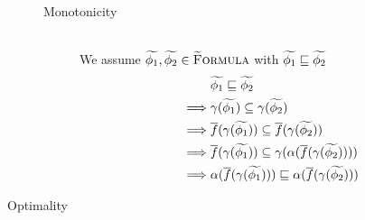 \begin{proofatend}
\begin{description}
\begin{description}
            \item[Monotonicity]~\\ 
            We assume $\widetilde{\phi_1}, \widetilde{\phi_2} \in \textup{\textsc{\ensuremath{\widetilde{\text{F}}}ormula}}$ with $\widetilde{\phi_1} \sqsubseteq \widetilde{\phi_2}$
            \begin{align*}
            &\grad{\phi_1} \mpt \grad{\phi_2}\\
            \implies
            &\gamma(\grad{\phi_1}) \subseteq \gamma(\grad{\phi_2})\\
            \implies
            &\overline{f}(\gamma(\grad{\phi_1})) \subseteq \overline{f}(\gamma(\grad{\phi_2}))\\
            \implies %
            &\overline{f}(\gamma(\grad{\phi_1})) \subseteq \gamma(\alpha(\overline{f}(\gamma(\grad{\phi_2}))))\\
            \implies %
            &\alpha(\overline{f}(\gamma(\grad{\phi_1}))) \mpt \alpha(\overline{f}(\gamma(\grad{\phi_2})))\\
            \end{align*}
        \end{description}
        
        \item[Optimality]~\\
        

\end{description}
\end{proofatend}
